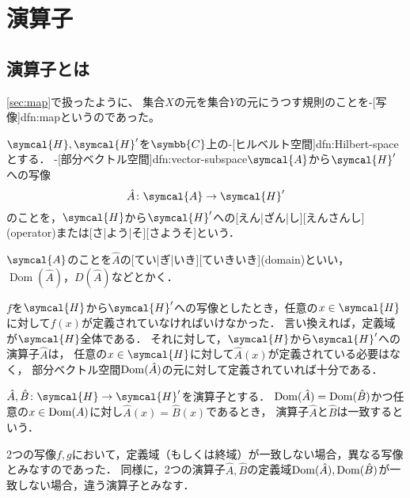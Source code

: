 \documentclass[../sotsu.tex]{subfiles}
\begin{document}
\section{演算子}
\label{sec:operator}

\subsection{演算子とは}
\label{sec:operator-intro}

\cref{sec:map}で扱ったように、
集合$X$の元を集合$Y$の元にうつす規則のことを-[写像]{dfn:map}というのであった。

\begin{definition}[演算子]
    $\symcal{H}, \symcal{H}'$を$\symbb{C}$上の-[ヒルベルト空間]{dfn:Hilbert-space}とする．
    -[部分ベクトル空間]{dfn:vector-subspace}$\symcal{A}$から$\symcal{H}'$への写像
    \begin{equation*}
        \hat{A} \colon \symcal{A} \to \symcal{H}'
    \end{equation*}
    のことを，$\symcal{H}$から$\symcal{H}'$への[えん|ざん|し][えんさんし](operator)または[さ|よう|そ][さようそ]という．
\end{definition}

\begin{definition}[演算子の定義域]
    $\symcal{A}$のことを$\hat{A}$の[てい|ぎ|いき][ていきいき](domain)といい，$\operatorname{Dom}(\hat{A})$，$D(\hat{A})$などとかく．
\end{definition}

$f$を$\symcal{H}$から$\symcal{H}'$への写像としたとき，任意の$x \in \symcal{H}$に対して$f(x)$が定義されていなければいけなかった．
言い換えれば，定義域が$\symcal{H}$全体である．
それに対して，$\symcal{H}$から$\symcal{H}'$への演算子$\hat{A}$は，
任意の$x \in \symcal{H}$に対して$\hat{A}(x)$が定義されている必要はなく，
部分ベクトル空間$\operatorname{Dom}(\hat{A})$の元に対して定義されていれば十分である．


\begin{definition}[演算子の一致]
    $\hat{A}, \hat{B} \colon \symcal{H} \to \symcal{H}'$を演算子とする．
    $\operatorname{Dom}(\hat{A}) = \operatorname{Dom}(\hat{B})$かつ任意の$x \in \operatorname{Dom}(A)$に対し$\hat{A}(x) = \hat{B}(x)$であるとき，
    演算子$\hat{A}$と$\hat{B}$は一致するという．
\end{definition}

2つの写像$f, g$において，定義域（もしくは終域）が一致しない場合，異なる写像とみなすのであった．
同様に，2つの演算子$\hat{A}, \hat{B}$の定義域$\operatorname{Dom}(\hat{A}), \operatorname{Dom}(\hat{B})$が一致しない場合，違う演算子とみなす．
\end{document}
